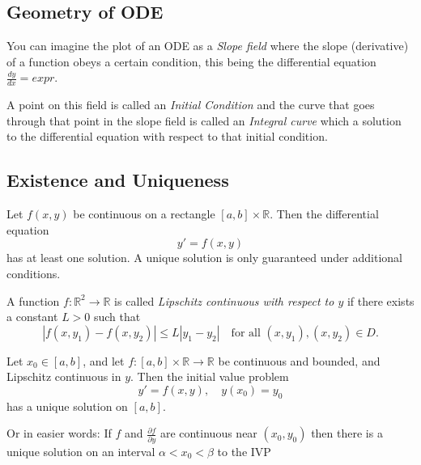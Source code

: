 \subsection{Geometry of ODE}

You can imagine the plot of an ODE as a \emph{Slope field} where the slope (derivative) of a function
obeys a certain condition, this being the differential equation \(\frac{dy}{dx} = expr\).
\vspace{\baselineskip}

A point on this field is called an \emph{Initial Condition} and the curve that goes through
that point in the slope field is called an \emph{Integral curve} which a solution to the differential
equation with respect to that initial condition.

\begin{center}
\end{center}

\subsection{Existence and Uniqueness}

Let \( f(x, y) \) be continuous on a rectangle \( [a, b] \times \mathbb{R} \). Then the differential equation
\[
y' = f(x, y)
\]
has at least one solution. A unique solution is only guaranteed under additional conditions.

A function \( f : \mathbb{R}^2 \to \mathbb{R} \) is called \emph{Lipschitz continuous with respect to \( y \)} if there exists a constant \( L > 0 \) such that
\[
|f(x, y_1) - f(x, y_2)| \leq L |y_1 - y_2|
\quad \text{for all } (x, y_1), (x, y_2) \in D.
\]

Let \( x_0 \in [a, b] \), and let \( f : [a, b] \times \mathbb{R} \to \mathbb{R} \) be continuous and bounded, and Lipschitz continuous in \( y \). Then the initial value problem
\[
y' = f(x, y), \quad y(x_0) = y_0
\]
has a unique solution on \( [a, b] \).
\vspace{\baselineskip}

Or in easier words: If \(f\) and \(\frac{\partial f}{\partial y}\) are continuous near \((x_0, y_0)\) then
there is a unique solution on an interval \(\alpha < x_0 < \beta\) to the IVP

